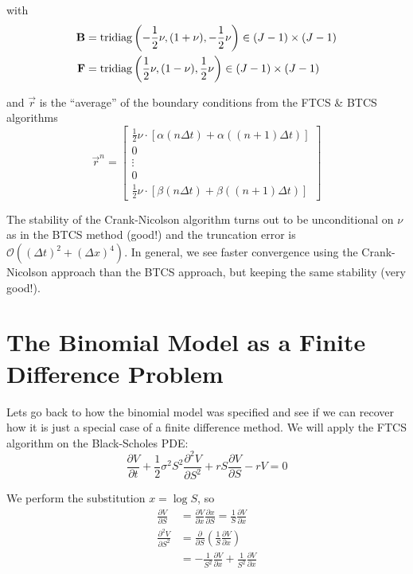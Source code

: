 \documentclass[12pt]{article}
\newlength\tindent
\renewcommand{\indent}{\hspace*{\tindent}}
\begin{document}
with
\begin{align*}
	{\bf B} &= \textrm{tridiag}\left( -\frac{1}{2}\nu, (1 + \nu), -\frac{1}{2}\nu \right) \in (J - 1) \times (J - 1) \\
	{\bf F} &= \textrm{tridiag}\left( \frac{1}{2}\nu, (1 - \nu), \frac{1}{2}\nu \right) \in (J - 1) \times (J - 1)
\end{align*}

and $\vec{r}$ is the ``average'' of the boundary conditions from the FTCS \& BTCS algorithms
\begin{equation*}
	\vec{r}^n =
	\begin{bmatrix}
		\frac{1}{2} \nu \cdot \left[ \alpha(n\Delta t) + \alpha((n + 1)\Delta t) \right] \\
		0 \\
		\vdots \\
		0 \\
		\frac{1}{2} \nu \cdot \left[ \beta(n\Delta t) + \beta((n + 1)\Delta t) \right]
	\end{bmatrix}
\end{equation*}

\indent The stability of the Crank-Nicolson algorithm turns out to be unconditional on $\nu$ as in the BTCS method (good!) and the truncation error is $\mathcal O\left( (\Delta t)^2 + (\Delta x)^4 \right)$. In general, we see faster convergence using the Crank-Nicolson approach than the BTCS approach, but keeping the same stability (very good!).

\section{The Binomial Model as a Finite Difference Problem}

\indent Lets go back to how the binomial model was specified and see if we can recover how it is just a special case of a finite difference method. We will apply the FTCS algorithm on the Black-Scholes PDE:
\begin{equation*}
	\frac{\partial V}{\partial t} + \frac{1}{2}\sigma^2S^2\frac{\partial^2 V}{\partial S^2} + rS\frac{\partial V}{\partial S} - rV = 0
\end{equation*}

We perform the substitution $x = \log S$, so
\begin{align*}
	\frac{ \partial V }{ \partial S } &= \frac{ \partial V }{ \partial x}\frac{\partial x }{ \partial S } = \frac{1}{S} \frac{ \partial V }{ \partial x } \\
	\frac{ \partial^2 V }{ \partial S^2 } &= \frac{ \partial }{ \partial S} \left( \frac{1}{S} \frac{ \partial V }{ \partial x } \right) \\ 
	&= -\frac{1}{S^2} \frac{ \partial V }{ \partial x } + \frac{1}{S^2} \frac{ \partial V }{ \partial x }
\end{align*}
\end{document}
